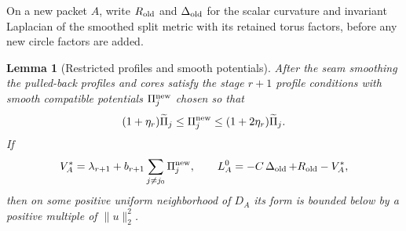 \documentclass[11pt]{article}
\numberwithin{equation}{section}
\newtheorem{lemma}[theorem]{Lemma}
\theoremstyle{definition}
\theoremstyle{remark}
\begin{document}
On a new packet $A$, write $R_{\rm old}$ and $\operatorname{\Delta}_{\rm old}$ for the
scalar curvature and invariant Laplacian of the smoothed split metric
with its retained torus factors, before any new circle factors are added.

\begin{lemma}[Restricted profiles and smooth potentials]\label{regular:profiles}
After the seam smoothing the pulled-back profiles and cores satisfy
the stage $r+1$ profile conditions with smooth compatible potentials
$\Pi_j^{\rm new}$ chosen so that
\[
 (1+\eta_r)\widetilde\Pi_j
 \le\Pi_j^{\rm new}\le(1+2\eta_r)\widetilde\Pi_j.
\]
If
\begin{equation}\label{regular:Vstar}
 V_A^*=\lambda_{r+1}+b_{r+1}\sum_{j\ne j_0}\Pi_j^{\rm new},\qquad
 L_A^0=-C\operatorname{\Delta}_{\rm old}+R_{\rm old}-V_A^*,
\end{equation}
then on some positive uniform neighborhood of $D_A$ its form is bounded
below by a positive multiple of $\|u\|_2^2$.
\end{lemma}
\end{document}
